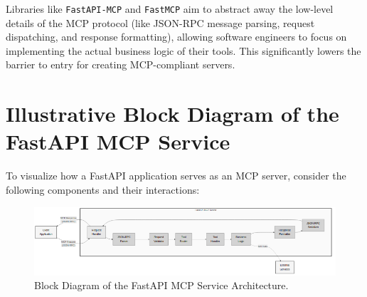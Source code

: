 Libraries like \texttt{FastAPI-MCP} and \texttt{FastMCP} aim to abstract away the low-level details of the MCP protocol 
(like JSON-RPC message parsing, request dispatching, and response formatting), allowing software engineers to focus on implementing 
the actual business logic of their tools. This significantly lowers the barrier to entry for creating MCP-compliant servers.

\section{Illustrative Block Diagram of the FastAPI MCP Service}
To visualize how a FastAPI application serves as an MCP server, consider the following components and their interactions:
\begin{figure}[htbp]
    \centering
    \includegraphics[width=\textwidth]{diagrams/mcp_server.png}
    \caption{Block Diagram of the FastAPI MCP Service Architecture.}
    \label{fig:mcp_server_diagram}
\end{figure}
